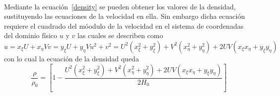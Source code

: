 \documentclass[letterpaper, openright, 12pt]{book}
\begin{document}
    \paragraph*{}
        Mediante la ecuación~\ref{density} se pueden obtener los valores de la
        densidad, sustituyendo las ecuaciones de la velocidad en ella. Sin
        embargo dicha ecuación requiere el cuadrado del móodulo de la velocidad
        en el sistema de coordenadas del dominio físico $u$ y $v$ las cuales se
        describen como
        \begin{subequations}
            \begin{equation}
                u = x_\xi U + x_\eta V
            \end{equation}
            \begin{equation}
                v = y_\xi U + y_\eta V
            \end{equation}
            \begin{equation}
                u^2 + v^2 = U^2 \left( x_\xi^2 + y_\xi^2 \right)
                        + V^2 \left( x_\eta^2 + y_\eta^2 \right)
                        + 2UV \left( x_\xi x_\eta + y_\xi y_\eta \right)
            \end{equation}
        \end{subequations}
        con lo cual la ecuación de la densidad queda
        \begin{equation}
            \frac{\rho}{\rho_0} = \left[ 1 -
                \frac{U^2 \left( x_\xi^2 + y_\xi^2 \right)
                        + V^2 \left( x_\eta^2 + y_\eta^2 \right)
                        + 2UV \left( x_\xi x_\eta + y_\xi y_\eta \right)}
                    {2H_0}
            \right]
        \end{equation}
\end{document}
